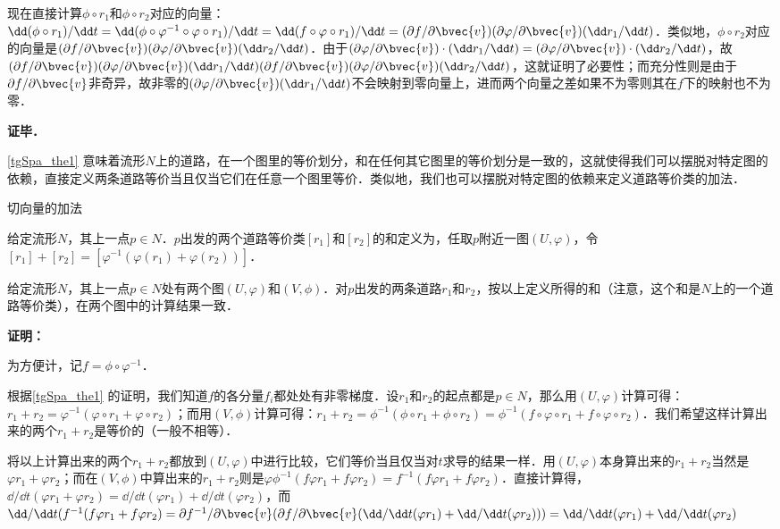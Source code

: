 现在直接计算$\phi\circ r_1$和$\phi\circ r_2$对应的向量：$\dd(\phi\circ r_1)/\dd t=\dd(\phi\circ\varphi^{-1}\circ\varphi\circ r_1)/\dd t=\dd(f\circ\varphi\circ r_1)/\dd t=(\partial f/\partial\bvec{v})(\partial\varphi/\partial\bvec{v})(\dd r_1/\dd t)$．类似地，$\phi\circ r_2$对应的向量是$(\partial f/\partial\bvec{v})(\partial\varphi/\partial\bvec{v})(\dd r_2/\dd t)$．由于$(\partial\varphi/\partial\bvec{v})\cdot(\dd r_1/\dd t)=(\partial\varphi/\partial\bvec{v})\cdot(\dd r_2/\dd t)$，故$(\partial f/\partial\bvec{v})(\partial\varphi/\partial\bvec{v})(\dd r_1/\dd t)(\partial f/\partial\bvec{v})(\partial\varphi/\partial\bvec{v})(\dd r_2/\dd t)$，这就证明了必要性；而充分性则是由于$\partial f/\partial\bvec{v}$非奇异，故非零的$(\partial\varphi/\partial\bvec{v})(\dd r_1/\dd t)$不会映射到零向量上，进而两个向量之差如果不为零则其在$f$下的映射也不为零．


\textbf{证毕．}

\autoref{tgSpa_the1} 意味着流形$N$上的道路，在一个图里的等价划分，和在任何其它图里的等价划分是一致的，这就使得我们可以摆脱对特定图的依赖，直接定义两条道路等价当且仅当它们在任意一个图里等价．类似地，我们也可以摆脱对特定图的依赖来定义道路等价类的加法．

\begin{definition}{切向量的加法}

给定流形$N$，其上一点$p\in N$．$p$出发的两个道路等价类$[r_1]$和$[r_2]$的和定义为，任取$p$附近一图$(U, \varphi)$，令$[r_1]+[r_2]=[\varphi^{-1}(\varphi(r_1)+\varphi(r_2))]$．

\end{definition}

\begin{theorem}{}
给定流形$N$，其上一点$p\in N$处有两个图$(U, \varphi)$和$(V, \phi)$．对$p$出发的两条道路$r_1$和$r_2$，按以上定义所得的和（注意，这个和是$N$上的一个道路等价类），在两个图中的计算结果一致．
\end{theorem}

\textbf{证明：}

为方便计，记$f=\phi\circ\varphi^{-1}$．

根据\autoref{tgSpa_the1} 的证明，我们知道$f$的各分量$f_i$都处处有非零梯度．设$r_1$和$r_2$的起点都是$p\in N$，那么用$(U, \varphi)$计算可得：$r_1+r_2=\varphi^{-1}(\varphi\circ r_1+\varphi\circ r_2)$；而用$(V, \phi)$计算可得：$r_1+r_2=\phi^{-1}(\phi\circ r_1+\phi\circ r_2)=\phi^{-1}(f\circ\varphi\circ r_1+f\circ\varphi\circ r_2)$．我们希望这样计算出来的两个$r_1+r_2$是等价的（一般不相等）．

将以上计算出来的两个$r_1+r_2$都放到$(U, \varphi)$中进行比较，它们等价当且仅当对$t$求导的结果一样．用$(U, \varphi)$本身算出来的$r_1+r_2$当然是$\varphi r_1+\varphi r_2$；而在$(V, \phi)$中算出来的$r_1+r_2$则是$\varphi\phi^{-1}(f\varphi r_1+f\varphi r_2)=f^{-1}(f\varphi r_1+f\varphi r_2)$．直接计算得，$\dd/\dd t(\varphi r_1+\varphi r_2)=\dd/\dd t(\varphi r_1)+\dd/\dd t(\varphi r_2)$，而$\dd/\dd t(f^{-1}(f\varphi r_1+f\varphi r_2)=\partial f^{-1}/\partial\bvec{v}(\partial f/\partial\bvec{v}(\dd/\dd t(\varphi r_1)+\dd/\dd t(\varphi r_2)))=\dd/\dd t(\varphi r_1)+\dd/\dd t(\varphi r_2)$

